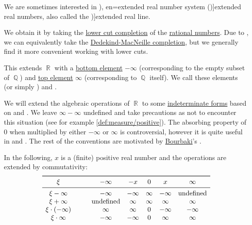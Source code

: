 \begin{definition}\label{def:extended_real_numbers}\mimprovised
  We are sometimes interested in \term[ru=расширенная вещественная прямая (\cite[23]{ИоффеТихомиров1974ЭкстремальныеЗадачи}), en=extended real number system (\cite[10]{Folland1999RealAnalysis})]{extended real numbers}, also called the \term[en=extended real line (\cite[\S 1.4]{Rudin1987RealAndComplexAnalysis})]{extended real line}.

  We obtain it by taking the \hyperref[def:lower_cut_completion]{ lower cut completion} of the \hyperref[def:rational_numbers]{rational numbers}. Due to , we can equivalently take the \hyperref[def:dedekind_macnielle_completion]{Dedekind-MacNeille completion}, but we generally find it more convenient working with lower cuts.

  This extends \( \BbbR \) with a \hyperref[def:extremal_points/top_and_bottom]{bottom element} \( -\infty \) (corresponding to the empty subset of \( \BbbQ \)) and \hyperref[def:extremal_points/top_and_bottom]{top element} \( \infty \) (corresponding to \( \BbbQ \) itself). We call these elements  (or simply ) and .

  We will extend the algebraic operations of \( \BbbR \) to some \hyperref[def:indeterminate_form]{indeterminate forms} based on \cite[\S 1.1.17]{Schechter1997AnalysisHandbook} and \cite[11]{Folland1999RealAnalysis}. We leave \( \infty - \infty \) undefined and take precautions as not to encounter this situation (see for example \cref{def:measure/positive}). The absorbing property of \( 0 \) when multiplied by either \( -\infty \) or \( \infty \) is controversial, however it is quite useful in  and . The rest of the conventions are motivated by \hyperref[rem:bourbaki]{Bourbaki}'s \cite[\S IV.4]{Bourbaki1995GeneralTopology1to4}.

  In the following, \( x \) is a (finite) positive real number and the operations are extended by commutativity:
  \begin{equation*}
    \begin{array}{c !{\qquad} *{5}{c}}
      \toprule
      \xi                 & -\infty       & -x      & 0      & x       & \infty        \\
      \midrule
      \xi - \infty        & -\infty       & -\infty & \infty & -\infty & \T{undefined} \\
      \xi + \infty        & \T{undefined} & \infty  & \infty & \infty  & \infty \\
      \xi \cdot (-\infty) & \infty        & \infty  & 0      & -\infty & -\infty \\
      \xi \cdot \infty    & -\infty       & -\infty & 0      & \infty  & \infty \\
    \end{array}
  \end{equation*}
\end{definition}
